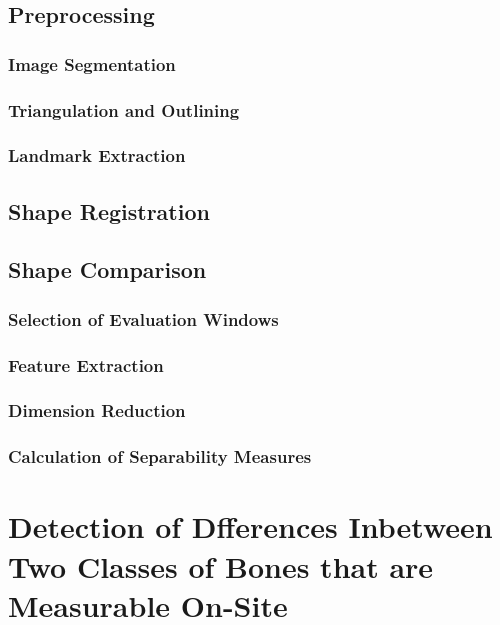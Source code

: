 \documentclass[pdftex,12pt,a4paper]{report}
\begin{document}
\section{Preprocessing}

\subsection{Image Segmentation}

\subsection{Triangulation and Outlining}

\subsection{Landmark Extraction}

\section{Shape Registration}

\section{Shape Comparison}

\subsection{Selection of Evaluation Windows}

\subsection{Feature Extraction}

\subsection{Dimension Reduction}

\subsection{Calculation of Separability Measures}

\chapter{Detection of Dfferences Inbetween Two Classes of Bones that are Measurable On-Site}
\end{document}
